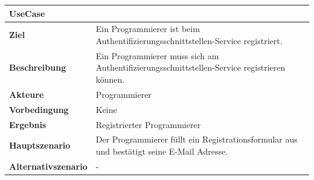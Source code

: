 \begin{longtable}[c]{@{}ll@{}}
\toprule
\begin{minipage}[b]{0.34\columnwidth}\raggedright\strut
\textbf{UseCase}
\strut\end{minipage} &
\begin{minipage}[b]{0.60\columnwidth}\raggedright\strut
\strut\end{minipage}\tabularnewline
\midrule
\endhead
\begin{minipage}[t]{0.34\columnwidth}\raggedright\strut
\textbf{Ziel}
\strut\end{minipage} &
\begin{minipage}[t]{0.60\columnwidth}\raggedright\strut
Ein Programmierer ist beim Authentifizierungsschnittstellen-Service
registriert.
\strut\end{minipage}\tabularnewline
\begin{minipage}[t]{0.34\columnwidth}\raggedright\strut
\textbf{Beschreibung}
\strut\end{minipage} &
\begin{minipage}[t]{0.60\columnwidth}\raggedright\strut
Ein Programmierer muss sich am Authentifizierungsschnittstellen-Service
registrieren können.
\strut\end{minipage}\tabularnewline
\begin{minipage}[t]{0.34\columnwidth}\raggedright\strut
\textbf{Akteure}
\strut\end{minipage} &
\begin{minipage}[t]{0.60\columnwidth}\raggedright\strut
Programmierer
\strut\end{minipage}\tabularnewline
\begin{minipage}[t]{0.34\columnwidth}\raggedright\strut
\textbf{Vorbedingung}
\strut\end{minipage} &
\begin{minipage}[t]{0.60\columnwidth}\raggedright\strut
Keine
\strut\end{minipage}\tabularnewline
\begin{minipage}[t]{0.34\columnwidth}\raggedright\strut
\textbf{Ergebnis}
\strut\end{minipage} &
\begin{minipage}[t]{0.60\columnwidth}\raggedright\strut
Registrierter Programmierer
\strut\end{minipage}\tabularnewline
\begin{minipage}[t]{0.34\columnwidth}\raggedright\strut
\textbf{Hauptszenario}
\strut\end{minipage} &
\begin{minipage}[t]{0.60\columnwidth}\raggedright\strut
Der Programmierer füllt ein Registrationsformular aus und bestätigt
seine E-Mail Adresse.
\strut\end{minipage}\tabularnewline
\begin{minipage}[t]{0.34\columnwidth}\raggedright\strut
\textbf{Alternativszenario}
\strut\end{minipage} &
\begin{minipage}[t]{0.60\columnwidth}\raggedright\strut
-
\strut\end{minipage}\tabularnewline
\bottomrule
\end{longtable}

